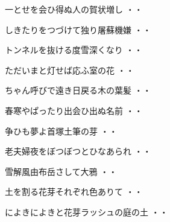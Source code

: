 \begin{shiika}一とせを会ひ得ぬ人の賀状増し
\hfill{・・}\end{shiika}
\vspace{0.6cm}
\begin{shiika}しきたりをつづけて独り屠蘇機嫌
\hfill{・・}\end{shiika}
\vspace{0.6cm}
\begin{shiika}トンネルを抜ける度雪深くなり
\hfill{・・}\end{shiika}
\vspace{0.6cm}
\begin{shiika}ただいまと灯せば応ふ室の花
\hfill{・・}\end{shiika}
\vspace{0.6cm}
\begin{shiika}ちゃん呼びで遠き日戻る木の葉髪
\hfill{・・}\end{shiika}
\vspace{0.6cm}
\begin{shiika}春寒やぱったり出会ひ出ぬ名前
\hfill{・・}\end{shiika}
\vspace{0.6cm}
\begin{shiika}争ひも夢よ首塚土筆の芽
\hfill{・・}\end{shiika}
\vspace{0.6cm}
\begin{shiika}老夫婦夜をぼつぼつとひなあられ
\hfill{・・}\end{shiika}
\vspace{0.6cm}
\begin{shiika}雪解風由布岳さして大鴉
\hfill{・・}\end{shiika}
\vspace{0.6cm}
\begin{shiika}土を割る花芽それぞれ色ありて
\hfill{・・}\end{shiika}
\vspace{0.6cm}
\begin{shiika}によきによきと花芽ラッシュの庭の土
\hfill{・・}\end{shiika}
\vspace{0.6cm}

